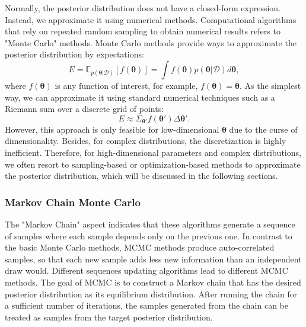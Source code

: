 Normally, the posterior distribution does not have a closed-form expression. Instead, we approximate it using numerical methods. Computational algorithms that rely on repeated random sampling to obtain numerical results refers to "Monte Carlo" methods. Monte Carlo methods provide ways to approximate the posterior distribution by expectations:
\begin{equation}
    E=\mathbb{E}_{p(\boldsymbol{\theta}|\mathcal{D})}[f(\boldsymbol{\theta})] = \int f(\boldsymbol{\theta}) p(\boldsymbol{\theta}|\mathcal{D}) d\boldsymbol{\theta},
\end{equation}
where $f(\boldsymbol{\theta})$ is any function of interest, for example, $f(\boldsymbol{\theta})=\boldsymbol{\theta}$. As the simplest way, we can approximate it using standard numerical techniques such as a Riemann sum over a discrete grid of points:
\begin{equation}
    E \approx \Sigma_{\boldsymbol{\theta}'} f(\boldsymbol{\theta}') \Delta \boldsymbol{\theta}'.
\end{equation}
However, this approach is only feasible for low-dimensional $\boldsymbol{\theta}$ due to the curse of dimensionality. Besides, for complex distributions, the discretization is highly inefficient. Therefore, for high-dimensional parameters and complex distributions, we often resort to sampling-based or optimization-based methods to approximate the posterior distribution, which will be discussed in the following sections.

\subsubsection{Markov Chain Monte Carlo}
The "Markov Chain" aspect indicates that these algorithms generate a sequence of samples where each sample depends only on the previous one. In contrast to the basic Monte Carlo methods, \acf{MCMC} methods produce auto-correlated samples, so that each new sample adds less new information than an independent draw would. Different sequences updating algorithms lead to different \ac{MCMC} methods. The goal of \ac{MCMC} is to construct a Markov chain that has the desired posterior distribution as its equilibrium distribution. After running the chain for a sufficient number of iterations, the samples generated from the chain can be treated as samples from the target posterior distribution.

